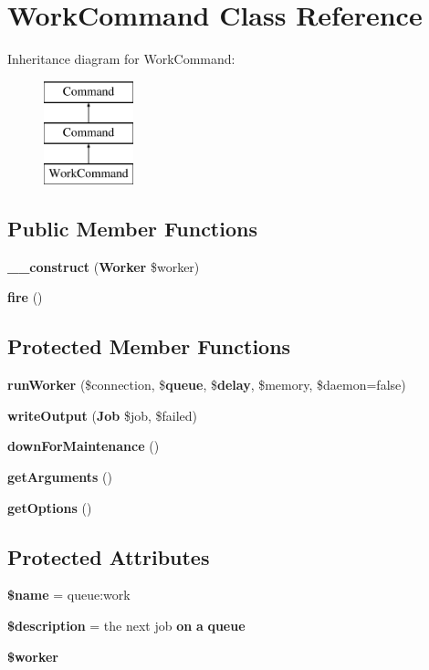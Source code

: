 \section{Work\+Command Class Reference}
\label{class_illuminate_1_1_queue_1_1_console_1_1_work_command}
Inheritance diagram for Work\+Command\+:\begin{figure}[H]
\begin{center}
\leavevmode
\includegraphics[height=3.000000cm]{class_illuminate_1_1_queue_1_1_console_1_1_work_command}
\end{center}
\end{figure}
\subsection*{Public Member Functions}
\begin{DoxyCompactItemize}
\item 
{\bf \+\_\+\+\_\+construct} ({\bf Worker} \$worker)
\item 
{\bf fire} ()
\end{DoxyCompactItemize}
\subsection*{Protected Member Functions}
\begin{DoxyCompactItemize}
\item 
{\bf run\+Worker} (\$connection, \${\bf queue}, \${\bf delay}, \$memory, \$daemon=false)
\item 
{\bf write\+Output} ({\bf Job} \$job, \$failed)
\item 
{\bf down\+For\+Maintenance} ()
\item 
{\bf get\+Arguments} ()
\item 
{\bf get\+Options} ()
\end{DoxyCompactItemize}
\subsection*{Protected Attributes}
\begin{DoxyCompactItemize}
\item 
{\bf \$name} = \textquotesingle{}queue\+:work\textquotesingle{}
\item 
{\bf \$description} =  the next job {\bf on} {\bf a} {\bf queue}\textquotesingle{}
\item 
{\bf \$worker}
\end{DoxyCompactItemize}



